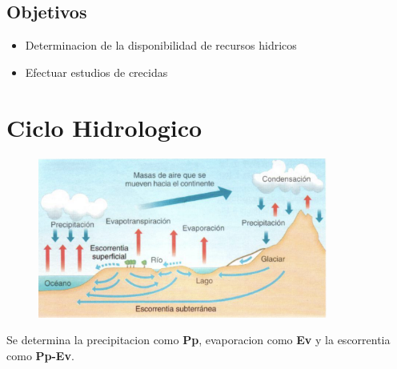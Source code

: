 \subsection{Objetivos}

\begin{itemize}
    \item Determinacion de la disponibilidad de recursos hidricos
    \item Efectuar estudios de crecidas
\end{itemize}

\section{Ciclo Hidrologico}

\begin{figure}[H]
    \centering
    \includegraphics[width=0.85\textwidth]{imagenes/ciclo_hidrologico.png}
    \label{fig:ciclo_hidrologico}
\end{figure}

Se determina la precipitacion como \textbf{Pp}, evaporacion como \textbf{Ev} y la escorrentia como \textbf{Pp-Ev}.
